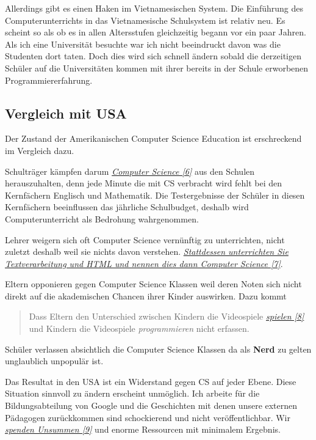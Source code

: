 Allerdings gibt es einen Haken im Vietnamesischen System. Die Einführung des Computerunterrichts in das Vietnamesische Schulsystem ist relativ neu. Es scheint so als ob es in allen Altersstufen gleichzeitig begann vor ein paar Jahren. Als ich eine Universität besuchte war ich nicht beeindruckt davon was die Studenten dort taten. Doch dies wird sich schnell ändern sobald die derzeitigen Schüler auf die Universitäten kommen mit ihrer bereits in der Schule erworbenen Programmiererfahrung.

\subsection*{Vergleich mit USA}
Der Zustand der Amerikanischen Computer Science Education ist erschreckend im Vergleich dazu.

Schulträger kämpfen darum \href{http://www.marylandpublicschools.org/MSDE/programs/esea/docs/TQ_Regulations/core_subjects.htm}{\textit{Computer Science [6]}} aus den Schulen herauszuhalten, denn jede Minute die mit CS verbracht wird fehlt bei den Kernfächern Englisch und Mathematik. Die Testergebnisse der Schüler in diesen Kernfächern beeinflussen das jährliche Schulbudget, deshalb wird Computerunterricht als Bedrohung wahrgenommen.

Lehrer weigern sich oft Computer Science vernünftig zu unterrichten, nicht zuletzt deshalb weil sie nichts davon verstehen.  \href{http://blog.carolynworks.com/?p=572}{\textit{Stattdessen unterrichten Sie Textverarbeitung und HTML und nennen dies dann Computer Science [7]}}.

Eltern opponieren gegen Computer Science Klassen weil deren Noten sich nicht direkt auf die akademischen Chancen ihrer Kinder auswirken. Dazu kommt  
\large 
\begin{quote}
\glqq 
Dass Eltern den Unterschied zwischen Kindern die Videospiele \href{http://www.youtube.com/watch?v=Lql-otlQfNo}{\textit{spielen [8]}} und Kindern die Videospiele \emph{programmieren} nicht erfassen.
\grqq
\end{quote}
\normalsize 
Schüler verlassen absichtlich die Computer Science Klassen da als \textbf{Nerd} zu gelten unglaublich unpopulär ist.

Das Resultat in den USA ist ein Widerstand gegen CS auf jeder Ebene. Diese Situation sinnvoll zu ändern erscheint unmöglich. Ich arbeite für die Bildungsabteilung von Google und die Geschichten mit denen unsere externen Pädagogen zurückkommen sind schockierend und nicht veröffentlichbar. Wir \href{http://neil.fraser.name/news/2011/07/16/}{\textit{spenden Unsummen [9]}} und enorme Ressourcen mit minimalem Ergebnis.

